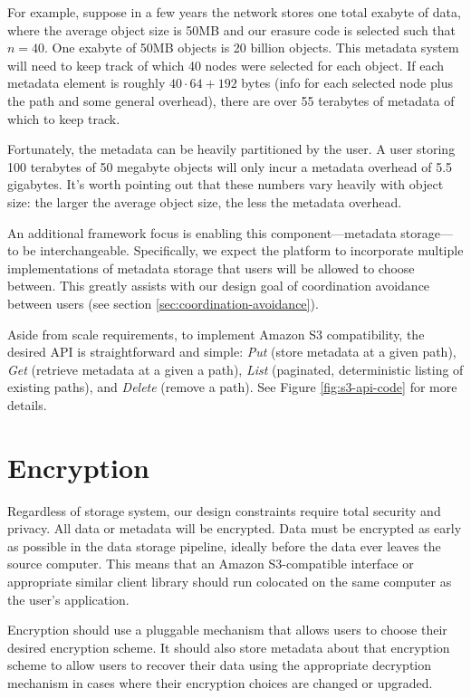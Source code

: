 \documentclass[8pt,fleqn,openany]{book}
\begin{document}
For example, suppose in
a few years the network stores one total exabyte of data, where the average object
size is 50MB and our erasure code is selected such that $n=40$.
One exabyte of 50MB objects is 20 billion objects.
This metadata system will need
to keep track of which 40 nodes were selected for each object.
If each metadata element is roughly $40\cdot 64+192$ bytes (info for each
selected node plus the path and some general overhead), there are over 55
terabytes of metadata of which to keep track.

Fortunately, the metadata can be heavily partitioned by the user. A user storing
100 terabytes of 50 megabyte objects will only incur a metadata overhead of 5.5
gigabytes. It's worth pointing out that these numbers vary
heavily with object size: the larger the average object size, the less the
metadata overhead.

An additional framework focus is enabling this component---metadata
storage---to be interchangeable. Specifically, we expect the platform to incorporate
multiple implementations of metadata storage that users will be allowed to
choose between. This greatly assists with our design goal of coordination
avoidance between users (see section \ref{sec:coordination-avoidance}).

Aside from scale requirements, to implement Amazon S3 compatibility,
the desired API is straightforward and
simple: {\em Put} (store metadata at a given path), {\em Get} (retrieve metadata at a
given a path),
{\em List} (paginated, deterministic listing of existing paths), and {\em Delete}
(remove a path). See Figure \ref{fig:s3-api-code} for more details.

\section{Encryption}

Regardless of storage system, our design constraints require total security
and privacy. All data or metadata will be encrypted.
Data must be encrypted as early as possible in the data storage pipeline,
ideally before the data ever leaves the source computer. This means that an
Amazon S3-compatible interface or appropriate similar client library should run
colocated on the same computer as the user's application.

Encryption should use a pluggable mechanism that allows users to choose their
desired encryption scheme. It should also store metadata about that encryption
scheme to allow users to recover their data using the appropriate decryption
mechanism in cases where their encryption choices are changed or upgraded.
\end{document}
